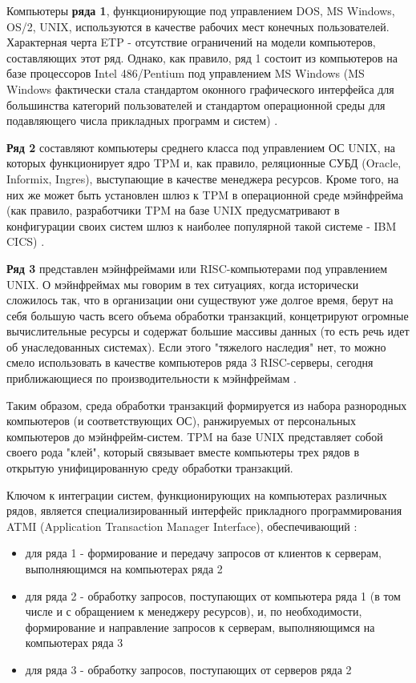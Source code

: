 Компьютеры \textbf{ряда 1}, функционирующие под управлением DOS, MS Windows, OS/2, UNIX, используются в качестве рабочих мест
конечных пользователей. Характерная черта ETP - отсутствие ограничений на модели компьютеров,
составляющих этот ряд. Однако, как правило, ряд 1 состоит из компьютеров на базе процессоров Intel
486/Pentium под управлением MS Windows (MS Windows фактически стала стандартом оконного графического интерфейса
для большинства категорий пользователей и стандартом операционной среды для подавляющего числа прикладных программ и систем) \autocite{TransactionMonitors}.

\textbf{Ряд 2} составляют компьютеры среднего класса под управлением ОС UNIX,
на которых функционирует ядро TPM и, как правило, реляционные СУБД (Oracle, Informix, Ingres),
выступающие в качестве менеджера ресурсов. Кроме того, на них же может быть установлен шлюз к TPM в
операционной среде мэйнфрейма (как правило, разработчики TPM на базе UNIX предусматривают в конфигурации своих
систем шлюз к наиболее популярной такой системе - IBM CICS) \autocite{TransactionMonitors}.

\textbf{Ряд 3} представлен мэйнфреймами или RISC-компьютерами под управлением UNIX. О мэйнфреймах мы
говорим в тех ситуациях, когда исторически сложилось так, что в организации они существуют уже долгое время,
берут на себя большую часть всего объема обработки транзакций, концетрируют огромные вычислительные
ресурсы и содержат большие массивы данных (то есть речь идет об унаследованных системах). Если этого
"тяжелого наследия" нет, то можно смело использовать в качестве компьютеров ряда 3 RISC-серверы,
сегодня приближающиеся по производительности к мэйнфреймам \autocite{TransactionMonitors}.

Таким образом, среда обработки транзакций формируется из набора разнородных компьютеров (и соответствующих ОС),
ранжируемых от персональных компьютеров до мэйнфрейм-систем. TPM на базе UNIX представляет собой своего
рода "клей", который связывает вместе компьютеры трех рядов в открытую унифицированную среду обработки транзакций.

Ключом к интеграции систем, функционирующих на компьютерах различных рядов, является специализированный
интерфейс прикладного программирования ATMI (Application Transaction Manager Interface), обеспечивающий \autocite{TransactionMonitors}:
\begin{itemize}
    \item для ряда 1 - формирование и передачу запросов от клиентов к серверам, выполняющимся на компьютерах ряда 2
    \item для ряда 2 - обработку запросов, поступающих от компьютера ряда 1 (в том числе и с
    обращением к менеджеру ресурсов), и, по необходимости, формирование и направление
    запросов к серверам, выполняющимся на компьютерах ряда 3
    \item для ряда 3 - обработку запросов, поступающих от серверов ряда 2
\end{itemize}

